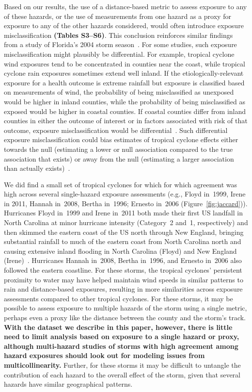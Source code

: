 Based on our results, the use of a distance-based metric to assess exposure to
any of these hazards, or the use of measurements from one hazard as a proxy for
exposure to any of the other hazards considered, would often introduce exposure
misclassification \textbf{(Tables S3--S6)}. This conclusion reinforces
similar findings from a study of Florida's 2004 storm
season~\parencite{grabich2015measuring}.  For some studies, such exposure
misclassification might plausibly be differential.  For example, tropical
cyclone wind exposures tend to be concentrated in counties near the coast,
while tropical cyclone rain exposures sometimes extend well inland.  If the
etiologically-relevant exposure for a health outcome is extreme rainfall but
exposure is classified based on measurements of wind, the probability of being
misclassified as unexposed would be higher in inland counties, while the
probability of being misclassified as exposed would be higher in coastal
counties. If coastal counties differ from inland counties in either the outcome
of interest or in factors associated with risk of that outcome, exposure
misclassification would be differential~\parencite{savitz2016interpreting}.
Such differential exposure misclassification could bias estimates of tropical
cyclone effects either towards the null (estimating a lower or null association
compared to the true association that exists) or away from the null (estimating
a larger association than actually exists)~\parencite{savitz2016interpreting,
armstrong1998effect}.  

We did find a small set of tropical cyclones for which for which agreement was
high across several single-hazard exposure assessments (e.g., Floyd in~1999,
Irene in 2011, Hannah in~2008, Bertha in~1996; Ernesto in~2006
(Figure~\ref{fig:jaccard})).  Hurricanes Floyd in~1999 and Irene in~2011 both
made their first \ac{US} landfall in North Carolina at minor hurricane
intensity (Category~2 and~1, respectively) and then skimmed the eastern coast
of the \ac{US} north through New England, bringing substantial rainfall to much
of the eastern coast from North Carolina north and causing extensive inland
flooding in North Carolina (Floyd) and New England
(Irene)~\parencite{avila2013atlantic, lawrence2000atlantic}.  Hurricanes Hannah
in~2008, Bertha in~1996, and Ernesto in~2006 also followed the eastern
coastline. For these storms, the tropical cyclones' persistent proximity to
water may have helped maintain wind speeds in similar patterns to rain and
distance-based exposures, resulting in more similarities across exposure
assessments compared to other tropical cyclones.  For these storms, it may be
possible to assess exposure to multiple hazards of the storm using a single
metric, perhaps even a proxy like the distance between the county and the
storm's track. \textbf{With the dataset we describe in this paper, however,
there is little need to limit analysis based on exposure to a single hazard or
proxy, although multi-hazard studies of storms with high agreement among hazard
exposures should look out for modeling issues from multicollinearity.} Further,
for these storms it may be difficult to untangle the contribution of each
hazard to the overall effect of the storm, given that several hazards have
similar geographical patterns. 

